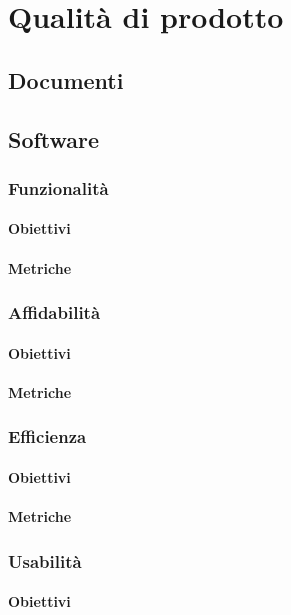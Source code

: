 \chapter{Qualità di prodotto}%
\section{Documenti}
\section{Software}
\subsection{Funzionalità}
\subsubsection{Obiettivi}
\subsubsection{Metriche}
\subsection{Affidabilità}
\subsubsection{Obiettivi}
\subsubsection{Metriche}
\subsection{Efficienza}
\subsubsection{Obiettivi}
\subsubsection{Metriche}
\subsection{Usabilità}
\subsubsection{Obiettivi}
